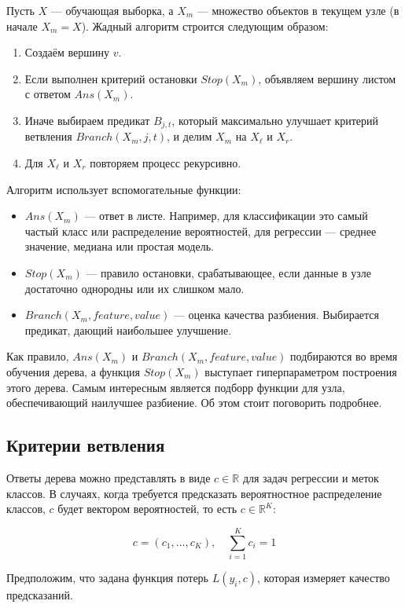 Пусть $X$ — обучающая выборка, а $X_m$ — множество объектов в текущем узле (в начале $X_m = X$). Жадный алгоритм строится следующим образом:

\begin{enumerate}
    \item Создаём вершину $v$.
    \item Если выполнен критерий остановки $Stop(X_m)$, объявляем вершину листом с ответом $Ans(X_m)$.
    \item Иначе выбираем предикат $B_{j,t}$, который максимально улучшает критерий ветвления $Branch(X_m, j, t)$, и делим $X_m$ на $X_{\ell}$ и $X_r$.
    \item Для $X_{\ell}$ и $X_r$ повторяем процесс рекурсивно.
\end{enumerate}

Алгоритм использует вспомогательные функции:
\begin{itemize}
    \item $Ans(X_m)$ — ответ в листе. Например, для классификации это самый частый класс или распределение вероятностей, для регрессии — среднее значение, медиана или простая модель.
    \item $Stop(X_m)$ — правило остановки, срабатывающее, если данные в узле достаточно однородны или их слишком мало.
    \item $Branch(X_m, \textit{feature}, \textit{value})$ — оценка качества разбиения. Выбирается предикат, дающий наибольшее улучшение.
\end{itemize}

Как правило, $Ans(X_m)$ и $Branch(X_m, \textit{feature}, \textit{value})$ подбираются во время обучения дерева, а функция $Stop(X_m)$ выступает гиперпараметром построения этого дерева.
Самым интересным является подборр функции для узла, обеспечивающий наилучшее разбиение. Об этом стоит поговорить подробнее.

\subsection{Критерии ветвления}
Ответы дерева можно представлять в виде $c \in \mathbb{R}$ для задач регрессии и меток классов. В случаях, когда требуется предсказать вероятностное распределение классов, $c$ будет вектором вероятностей, то есть $c \in \mathbb{R}^K$:

\[
c = (c_1, \dots, c_K), \quad \sum_{i=1}^K c_i = 1
\]

Предположим, что задана функция потерь $L(y_i, c)$, которая измеряет качество предсказаний.


